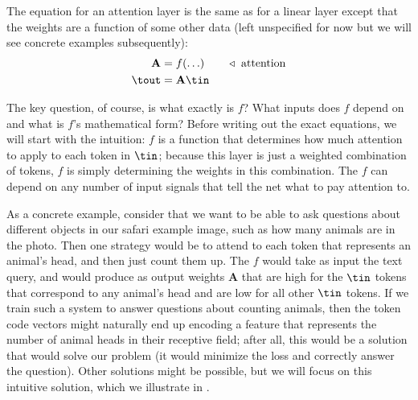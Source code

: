 The equation for an attention layer is the same as for a linear layer except that the weights are a function of some other data (left unspecified for now but we will see concrete examples subsequently):
\begin{align}
    \mathbf{A} &= f(\ldots) \quad\quad \triangleleft \text{ attention}\\
    \tout &= \mathbf{A}\tin
\end{align}

The key question, of course, is what exactly is $f$? What inputs does $f$ depend on and what is $f$'s mathematical form? Before writing out the exact equations, we will start with the intuition: $f$ is a function that determines how much attention to apply to each token in $\tin$; because this layer is just a weighted combination of tokens, $f$ is simply determining the weights in this combination. The $f$ can depend on any number of input signals that tell the net what to pay attention to.%

As a concrete example, consider that we want to be able to ask questions about different objects in our safari example image, such as how many animals are in the photo. Then one strategy would be to attend to each token that represents an animal's head, and then just count them up. The $f$ would take as input the text query, and would produce as output weights $\mathbf{A}$ that are high for the $\tin$ tokens that correspond to any animal's head and are low for all other $\tin$ tokens. If we train such a system to answer questions about counting animals, then the token code vectors might naturally end up encoding a feature that represents the number of animal heads in their receptive field; after all, this would be a solution that would solve our problem (it would minimize the loss and correctly answer the question). Other solutions might be possible, but we will focus on this intuitive solution, which we illustrate in \fig{\ref{fig:transformers:attention_layer_safari_query_cartoon}}.


